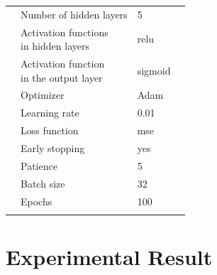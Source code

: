 \begin{table}[!t]
\begin{tabular*}{\columnwidth}{@{\extracolsep\fill}llll@{\extracolsep\fill}}
\addlinespace[2pt]
\cline{1-3}
\addlinespace[2pt]
\multirow{6}{*}{MLP} & Number of hidden layers&5 \\
			&\shortstack{Activation functions \\in hidden layers}&relu \\
			&\shortstack{Activation function \\in the output layer}&sigmoid \\
			&Optimizer&Adam \\
                        & Learning rate&0.01 \\
                        & Loss function &mse \\
                        & Early stopping&yes\\
			& Patience&5\\
                        & Batch size &32 \\
                        & Epochs &100 \\
\botrule
\end{tabular*}
\end{table}
\section{Experimental Result}
